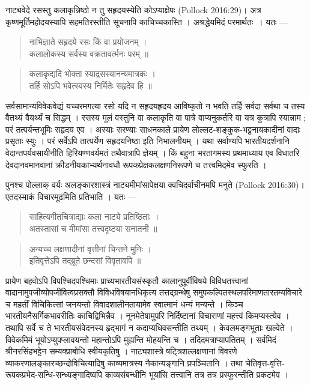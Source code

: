 {\dev नाट्यवेदे रसस्तु कलाकृन्निष्ठो न तु सहृदयस्येति कोऽप्याक्षेपः} (Pollock 2016:29){\dev । अत्र कृष्णमूर्तिमहोदयस्यापि सहमतिरस्तीति सूचनापि काचिच्चकास्ति । अश्रद्धेयमिदं परमार्थतः~। यतः ---}
\begin{quote}
{\dev नाभिज्ञाते सहृदये रसः किं वा प्रयोजनम् ।}\\
{\dev कलालोकस्य सर्वस्य वक्रतावर्त्मनः परम् ॥}
\end{quote}
\begin{quote}
{\dev कलाकृद्यदि भोक्ता स्याद्रसस्यानन्यमात्रकः ।}\\
{\dev तर्हि सोऽपि भवेत्स्वस्य निर्मितेः सहृदेव हि ॥}
\end{quote}

{\dev सर्वसामान्यविवेकवेद्यं यच्चरमगत्या रसो यदि न सहृदयहृदय आविष्कृतो न भवति तर्हि सर्वदा सर्वथा च तस्य वैतथ्यं वैयर्थ्यं च सिद्धम् । रसस्य मूलं वस्तुनि वा कलाकृति वा पात्रे वाप्यनुकर्तरि वा  यत्र कुत्रापि स्यान्नाम ; परं तत्पर्यन्तभूमिः सहृदय एव । अस्याः सरण्याः साधनकाले प्रायेण लोल्लट-शङ्कुक-भट्टनायकादीनां वादाः प्रसृताः स्युः । परं सर्वेऽपि तात्पर्येण सहृदयनिष्ठा इति निभालनीयम् । यथा सर्वाण्यपि भारतीयदर्शनानि वेदान्तपर्यवसायीनीति हिरियण्णवर्यमतं तथैवात्रापि ज्ञेयम् । किं बहुना भरतागमस्य प्रथमाध्याय एव विधातरि देवदानवमानवानां क्रीडनीयकाभ्यर्थनावधौ रूपकप्रेक्षकलक्षणनिरूपणे च तत्त्वमिदमेव स्फुरति ।}

{\dev पुनश्च पोल्लाक् वर्यः अलङ्कारशास्त्रं नाट्यमीमांसापेक्षया क्वचिदर्वाचीनमपि मनुते} (Pollock 2016:30){\dev । एतदस्माकं विचारमूढमिति प्रतिभाति । यतः ---}
\begin{quote}
{\dev साहित्यगीतचित्राद्याः कला नाट्ये प्रतिष्ठिताः ।}\\
{\dev अतस्तासां च मीमांसा तत्त्वदृष्ट्या सनातनी ॥}
\end{quote}
\begin{quote}
{\dev अन्यच्च लक्षणादीनां वृत्तीनां चिन्तने मुनिः ।}\\
{\dev इतिवृत्तेऽपि तद्ब्रूते छन्दसां विवृतावपि ॥}
\end{quote}

{\dev प्रायेण बहवोऽपि विपश्चिदपश्चिमाः प्राच्यभारतीयसंस्कृतौ कालानुपूर्वीविषये विविधतत्त्वानां वादानामुपजीव्योपजीवित्वप्रसक्तौ विविधविषयानधिकृत्य तत्तद्ग्रन्थेषु समुपकल्पितस्थलपरि\-माणतारतम्यविचारे च महतीं विचिकित्सां जनयन्तो विवादशालीनतायामेव स्वात्मानं धन्यं मन्यन्ते । किञ्च भारतीयनैसर्गिकभावरीतिः काचिद्विभिन्नैव । नूनमेतेषामुपरि निर्दिष्टानां विचा\-राणां महत्त्वं किमप्यस्त्येव । तथापि सर्वे च ते भारतीयसंवेदनस्य हृद्भागं न कदाप्यधिवसन्तीति तथ्यम् । केवलमङ्गभूताः खल्वेते । विवेकमिमं भूयोऽप्युपप्लावयन्तो महान्तोऽपि मुह्यन्ति मोहयन्ति च । तदिदमत्राप्यापतितम् । सर्वमिदं श्रीनरसिंहभट्टेन सम्यक्प्राबोधि स्वीयकृतिषु । नाट्यशास्त्रे षट्त्रिशल्लक्षणानां विवरणे व्याकरणालङ्कारच्छन्दोविचित्यादिषु काव्यमात्रस्य नैका\-न्यङ्गानि प्रपञ्चितानि । तथा चेतिवृत्त-वृत्ति-रूपकप्रभेद-सन्धि-सन्ध्यङ्गादिष्वपि काव्यसंबन्धीनि भूयांसि तत्त्वानि तत्र तत्र प्रस्फुरन्तीति प्रकटमेव ।} 


